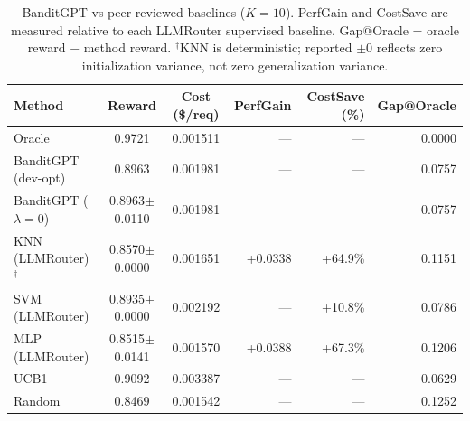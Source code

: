 \begin{table}[htbp]
\centering
\caption{BanditGPT vs peer-reviewed baselines ($K{=}10$). PerfGain and CostSave are measured relative to each LLMRouter supervised baseline. Gap@Oracle = oracle reward $-$ method reward. $^\dagger$KNN is deterministic; reported $\pm$0 reflects zero initialization variance, not zero generalization variance.}
\label{tab:summary_k10}
\small
\begin{tabular}{lccrrr}
\toprule
Method & Reward & Cost (\$/req) & PerfGain & CostSave (\%) & Gap@Oracle \\
\midrule
Oracle & 0.9721 & 0.001511 & --- & --- & 0.0000 \\
BanditGPT (dev-opt) & 0.8963 & 0.001981 & --- & --- & 0.0757 \\
BanditGPT ($\lambda{=}0$) & 0.8963$\pm$0.0110 & 0.001981 & --- & --- & 0.0757 \\
KNN (LLMRouter)$^\dagger$ & 0.8570$\pm$0.0000 & 0.001651 & +0.0338 & +64.9\% & 0.1151 \\
SVM (LLMRouter) & 0.8935$\pm$0.0000 & 0.002192 & --- & +10.8\% & 0.0786 \\
MLP (LLMRouter) & 0.8515$\pm$0.0141 & 0.001570 & +0.0388 & +67.3\% & 0.1206 \\
UCB1 & 0.9092 & 0.003387 & --- & --- & 0.0629 \\
Random & 0.8469 & 0.001542 & --- & --- & 0.1252 \\
\bottomrule
\end{tabular}
\end{table}
